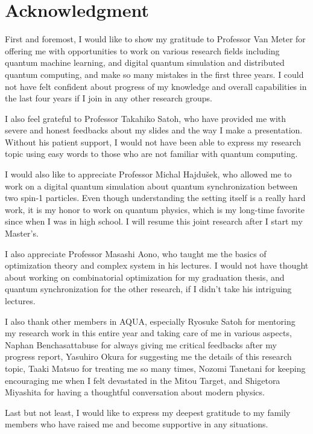 \chapter*{Acknowledgment}
\label{thanks}

First and foremost, I would like to show my gratitude to Professor Van Meter for offering me with opportunities to work on various research fields including quantum machine learning, and digital quantum simulation and distributed quantum computing, and make so many mistakes in the first three years. I could not have felt confident about progress of my knowledge and overall capabilities in the last four years if I join in any other research groups.

I also feel grateful to Professor Takahiko Satoh, who have provided me with severe and honest feedbacks about my slides and the way I make a presentation.  Without his patient support, I would not have been able to express my research topic using easy words to those who are not familiar with quantum computing.

I would also like to appreciate Professor  Michal Hajdušek, who allowed me to work on a digital quantum simulation about quantum synchronization between two spin-1 particles.  Even though understanding the setting itself is a really hard work, it is my honor to work on quantum physics, which is my long-time favorite since when I was in high school.  I will resume this joint research after I start my Master's.

I also appreciate Professor Masashi Aono, who taught me the basics of optimization theory and complex system in his lectures.  I would not have thought about working on combinatorial optimization for my graduation thesis, and quantum synchronization for the other research, if I didn't take his intriguing lectures.

I also thank other members in AQUA, especially Ryosuke Satoh for mentoring my research work in this entire year and taking care of me in various aspects, Naphan Benchasattabuse for always giving me critical feedbacks after my progress report, Yasuhiro Okura for suggesting me the details of this research topic, Taaki Matsuo for treating me so many times, Nozomi Tanetani for keeping encouraging me when I felt devastated in the Mitou Target, and Shigetora Miyashita for having a thoughtful conversation about modern physics.

Last but not least, I would like to express my deepest gratitude to my family members who have raised me and become supportive in any situations.  
